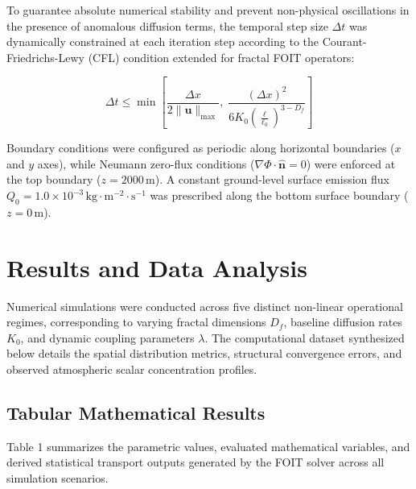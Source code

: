 \documentclass[11pt,a4paper]{article}
\begin{document}
To guarantee absolute numerical stability and prevent non-physical oscillations in the presence of anomalous diffusion terms, the temporal step size $\Delta t$ was dynamically constrained at each iteration step according to the Courant-Friedrichs-Lewy (CFL) condition extended for fractal FOIT operators:

\begin{equation}
\Delta t \le \min \left[ \frac{\Delta x}{2 \|\mathbf{u}\|_{\max}}, \; \frac{(\Delta x)^2}{6 K_0 \left(\frac{\ell}{\ell_0}\right)^{3 - D_f}} \right]
\label{eq:cfl_condition}
\end{equation}

Boundary conditions were configured as periodic along horizontal boundaries ($x$ and $y$ axes), while Neumann zero-flux conditions ($\nabla \Phi \cdot \hat{\mathbf{n}} = 0$) were enforced at the top boundary ($z = 2000\,\text{m}$). A constant ground-level surface emission flux $Q_0 = 1.0 \times 10^{-3}\,\text{kg}\cdot\text{m}^{-2}\cdot\text{s}^{-1}$ was prescribed along the bottom surface boundary ($z = 0\,\text{m}$).

\section{Results and Data Analysis}

Numerical simulations were conducted across five distinct non-linear operational regimes, corresponding to varying fractal dimensions $D_f$, baseline diffusion rates $K_0$, and dynamic coupling parameters $\lambda$. The computational dataset synthesized below details the spatial distribution metrics, structural convergence errors, and observed atmospheric scalar concentration profiles.

\subsection{Tabular Mathematical Results}

Table 1 summarizes the parametric values, evaluated mathematical variables, and derived statistical transport outputs generated by the FOIT solver across all simulation scenarios.
\end{document}

